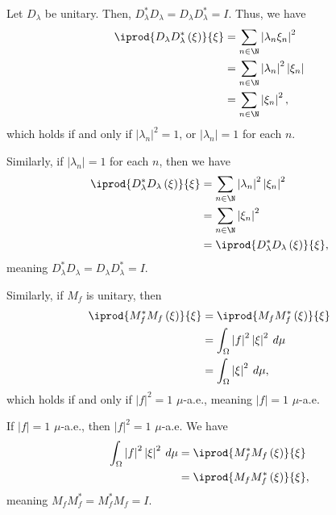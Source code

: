 \documentclass[10pt]{mypackage}
\begin{document}
\begin{solution}
  Let $D_{\lambda}$ be unitary. Then, $D_{\lambda}^{\ast} D_{\lambda} = D_{\lambda}D_{\lambda}^{\ast} = I$. Thus, we have
  \begin{align*}
    \iprod{D_{\lambda}D_{\lambda}^{\ast}\left(\xi\right)}{\xi} &= \sum_{n\in \N}\left\vert \lambda_n\xi_n \right\vert^2\\
                                                               &= \sum_{n\in \N}\left\vert \lambda_n \right\vert^2 \left\vert \xi_n \right\vert\\
                                                               &= \sum_{n\in \N}\left\vert \xi_n \right\vert^2,
  \end{align*}
  which holds if and only if $\left\vert \lambda_n \right\vert^2 = 1$, or $\left\vert \lambda_n \right\vert = 1$ for each $n$.\newline

  Similarly, if $\left\vert \lambda_n \right\vert = 1$ for each $n$, then we have
  \begin{align*}
    \iprod{D_{\lambda}^{\ast}D_{\lambda}\left(\xi\right)}{\xi} &= \sum_{n\in \N}\left\vert \lambda_n \right\vert^2\left\vert \xi_n \right\vert^2\\
                                                               &= \sum_{n\in \N}\left\vert \xi_n \right\vert^2\\
                                                               &= \iprod{D_{\lambda}^{\ast}D_{\lambda}\left(\xi\right)}{\xi},
  \end{align*}
  meaning $D_{\lambda}^{\ast}D_{\lambda} = D_{\lambda}D_{\lambda}^{\ast}=I$.\newline

  Similarly, if $M_f$ is unitary, then
  \begin{align*}
    \iprod{M_f^{\ast}M_f\left(\xi\right)}{\xi} &= \iprod{M_fM_f^{\ast}\left(\xi\right)}{\xi}\\
                                               &= \int_{\Omega}^{} \left\vert f \right\vert^2\left\vert \xi \right\vert^2\:d\mu\\
                                               &= \int_{\Omega}^{} \left\vert \xi \right\vert^2\:d\mu,
  \end{align*}
  which holds if and only if $\left\vert f \right\vert^2 = 1$ $\mu$-a.e., meaning $\left\vert f \right\vert = 1$ $\mu$-a.e.\newline

  If $\left\vert f \right\vert = 1$ $\mu$-a.e., then $\left\vert f \right\vert^2 = 1$ $\mu$-a.e. We have
  \begin{align*}
    \int_{\Omega}^{} \left\vert f \right\vert^2\left\vert \xi \right\vert^2\:d\mu &= \iprod{M_f^{\ast}M_f\left(\xi\right)}{\xi}\\
                                                                                  &= \iprod{M_fM_f^{\ast}\left(\xi\right)}{\xi},
  \end{align*}
  meaning $M_fM_f^{\ast} = M_f^{\ast}M_f = I$.
\end{solution}
\end{document}
